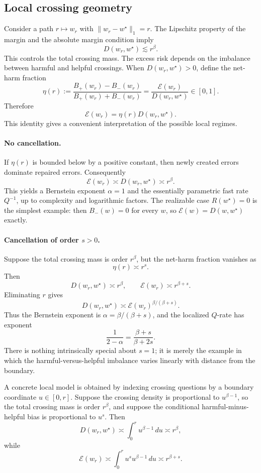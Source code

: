 \documentclass[11pt]{article}
\newcommand{\wstar}{w^\star}
\begin{document}
\subsection{Local crossing geometry}

Consider a path $r\mapsto w_r$ with $\|w_r-\wstar\|_1=r$.  The Lipschitz property of the margin and the absolute margin condition imply
\[
D(w_r,\wstar)\lesssim r^\beta.
\]
This controls the total crossing mass.  The excess risk depends on the imbalance between harmful and helpful crossings.  When $D(w_r,\wstar)>0$, define the net-harm fraction
\[
\eta(r)
:=
\frac{B_+(w_r)-B_-(w_r)}{B_+(w_r)+B_-(w_r)}
=
\frac{\mathcal E(w_r)}{D(w_r,\wstar)}
\in[0,1].
\]
Therefore
\[
\mathcal E(w_r)=\eta(r)D(w_r,\wstar).
\]
This identity gives a convenient interpretation of the possible local regimes.

\paragraph{No cancellation.}
If $\eta(r)$ is bounded below by a positive constant, then newly created errors dominate repaired errors.  Consequently
\[
\mathcal E(w_r)\asymp D(w_r,\wstar)\asymp r^\beta.
\]
This yields a Bernstein exponent $\alpha=1$ and the essentially parametric fast rate $Q^{-1}$, up to complexity and logarithmic factors.  The realizable case $R(\wstar)=0$ is the simplest example: then $B_-(w)=0$ for every $w$, so $\mathcal E(w)=D(w,\wstar)$ exactly.

\paragraph{Cancellation of order $s>0$.}
Suppose the total crossing mass is order $r^\beta$, but the net-harm fraction vanishes as
\[
\eta(r)\asymp r^s.
\]
Then
\[
D(w_r,\wstar)\asymp r^\beta,
\qquad
\mathcal E(w_r)\asymp r^{\beta+s}.
\]
Eliminating $r$ gives
\[
D(w_r,\wstar)
\asymp
\mathcal E(w_r)^{\beta/(\beta+s)}.
\]
Thus the Bernstein exponent is $\alpha=\beta/(\beta+s)$, and the localized $Q$-rate has exponent
\[
\frac{1}{2-\alpha}
=
\frac{\beta+s}{\beta+2s}.
\]
There is nothing intrinsically special about $s=1$; it is merely the example in which the harmful-versus-helpful imbalance varies linearly with distance from the boundary.

A concrete local model is obtained by indexing crossing questions by a boundary coordinate $u\in[0,r]$.  Suppose the crossing density is proportional to $u^{\beta-1}$, so the total crossing mass is order $r^\beta$, and suppose the conditional harmful-minus-helpful bias is proportional to $u^s$.  Then
\[
D(w_r,\wstar)
\asymp
\int_0^r u^{\beta-1}\,du
\asymp r^\beta,
\]
while
\[
\mathcal E(w_r)
\asymp
\int_0^r u^s u^{\beta-1}\,du
\asymp r^{\beta+s}.
\]
\end{document}
